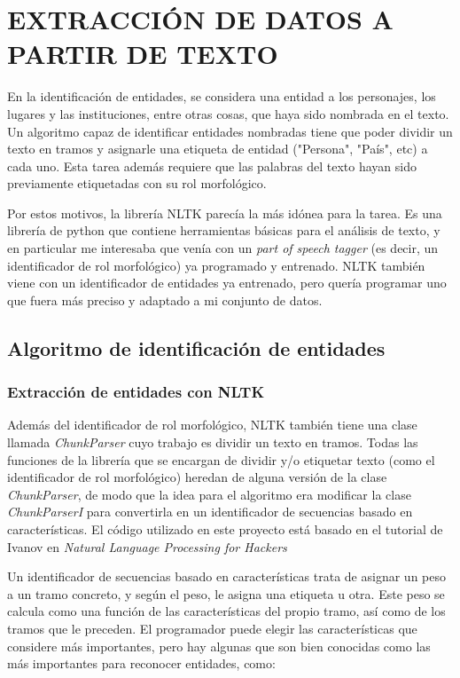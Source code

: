 \documentclass{pre-tfg}
\begin{document}
\section {EXTRACCIÓN DE DATOS A PARTIR DE TEXTO}

En la identificación de entidades, se considera una entidad a los personajes, los lugares y las instituciones, entre otras cosas, que haya sido nombrada en el texto. Un algoritmo capaz de identificar entidades nombradas tiene que poder dividir un texto en tramos y asignarle una etiqueta de entidad ("Persona", "País", etc) a cada uno. Esta tarea además requiere que las palabras del texto hayan sido previamente etiquetadas con su rol morfológico.

Por estos motivos, la librería NLTK parecía la más idónea para la tarea. Es una librería de python que contiene herramientas básicas para el análisis de texto, y en particular me interesaba que venía con un \textit{part of speech tagger} (es decir, un identificador de rol morfológico) ya programado y entrenado. NLTK también viene con un identificador de entidades ya entrenado, pero quería programar uno que fuera más preciso y adaptado a mi conjunto de datos.



\subsection{Algoritmo de identificación de entidades}

\subsubsection{Extracción de entidades con NLTK}

Además del identificador de rol morfológico, NLTK también tiene una clase llamada \textit{ChunkParser} cuyo trabajo es dividir un texto en tramos. Todas las funciones de la librería que se encargan de dividir y/o etiquetar texto (como el identificador de rol morfológico) heredan de alguna versión de la clase \textit{ChunkParser}, de modo que la idea para el algoritmo era modificar la clase \textit{ChunkParserI} para convertirla en un identificador de secuencias basado en características. El código utilizado en este proyecto está basado en el tutorial de Ivanov en \textit{Natural Language Processing for Hackers} \cite{ivanov_2016}

Un identificador de secuencias basado en características trata de asignar un peso a un tramo concreto, y según el peso, le asigna una etiqueta u otra. Este peso se calcula como una función de las características del propio tramo, así como de los tramos que le preceden.
El programador puede elegir las características que considere más importantes, pero hay algunas que son bien conocidas como las más importantes para reconocer entidades, como:
\end{document}

